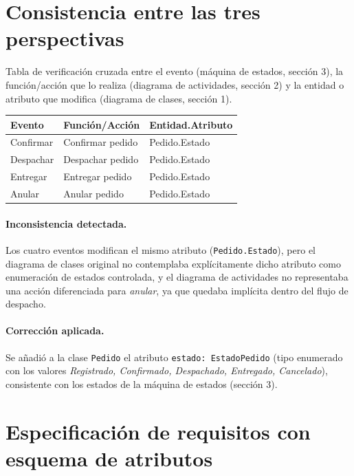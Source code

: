 \documentclass[11pt,a4paper]{article}
\begin{document}
\section{Consistencia entre las tres perspectivas}

Tabla de verificación cruzada entre el evento (máquina de estados, sección 3),
la función/acción que lo realiza (diagrama de actividades, sección 2) y la
entidad o atributo que modifica (diagrama de clases, sección 1).

\begin{center}
\begin{tabular}{@{}lll@{}}
\toprule
\textbf{Evento} & \textbf{Función/Acción} & \textbf{Entidad.Atributo} \\
\midrule
Confirmar & Confirmar pedido & Pedido.Estado \\
Despachar & Despachar pedido & Pedido.Estado \\
Entregar  & Entregar pedido  & Pedido.Estado \\
Anular    & Anular pedido    & Pedido.Estado \\
\bottomrule
\end{tabular}
\end{center}

\paragraph{Inconsistencia detectada.} Los cuatro eventos modifican el mismo
atributo (\texttt{Pedido.Estado}), pero el diagrama de clases original no
contemplaba explícitamente dicho atributo como enumeración de estados
controlada, y el diagrama de actividades no representaba una acción
diferenciada para \emph{anular}, ya que quedaba implícita dentro del flujo de
despacho.

\paragraph{Corrección aplicada.} Se añadió a la clase \texttt{Pedido} el
atributo \texttt{estado: EstadoPedido} (tipo enumerado con los valores
\emph{Registrado, Confirmado, Despachado, Entregado, Cancelado}), consistente
con los estados de la máquina de estados (sección 3).

\section{Especificación de requisitos con esquema de atributos}
\end{document}
